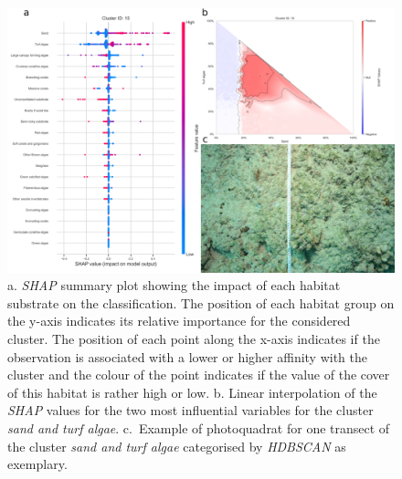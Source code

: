\begin{figure}
\hypertarget{fig:chap2figS35}{%
\centering
\includegraphics{03-Chapitre2/figures/supplementary/05-explanation_shap_pq_cluster_15.png}
\caption{a. \emph{SHAP} summary plot showing the impact of each habitat
substrate on the classification. The position of each habitat group on
the y-axis indicates its relative importance for the considered cluster.
The position of each point along the x-axis indicates if the observation
is associated with a lower or higher affinity with the cluster and the
colour of the point indicates if the value of the cover of this habitat
is rather high or low. b. Linear interpolation of the \emph{SHAP} values
for the two most influential variables for the cluster \emph{sand and
turf algae}. c.~Example of photoquadrat for one transect of the cluster
\emph{sand and turf algae} categorised by \emph{HDBSCAN} as
exemplary.}\label{fig:chap2figS35}
}
\end{figure}

